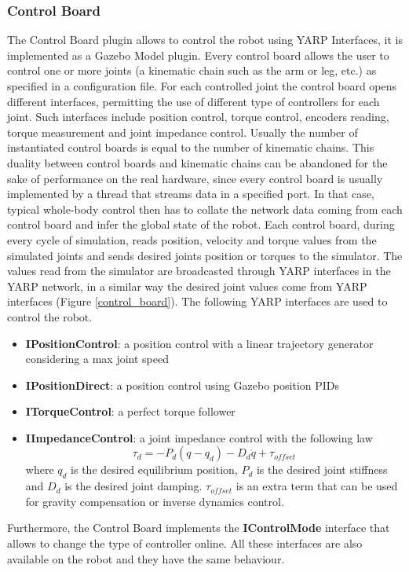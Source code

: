 \subsubsection{Control Board}
The Control Board plugin allows to control the robot using YARP Interfaces, it is implemented as a Gazebo Model plugin. Every control board allows the user to control one or more joints (a kinematic chain such as the arm or leg, etc.) as specified in a configuration file. For each controlled joint the control board opens different interfaces, permitting the use of different type of controllers for each joint. Such interfaces include position control, torque control, encoders reading, torque measurement and joint impedance control. Usually the number of instantiated control boards is equal to the number of kinematic chains.
This duality between control boards and kinematic chains can be abandoned for the sake of performance on the real hardware, since every control board is usually implemented by a thread that streams data in a specified port. In that case, typical whole-body control then has to collate the network data coming from each control board and infer the global state of the robot. Each control board, during every cycle of simulation, reads position, velocity and torque values from the simulated joints and sends desired joints position or torques to the simulator. The values read from the simulator are broadcasted through YARP interfaces in the YARP network, in a similar way the desired joint values come from YARP interfaces (Figure \ref{control_board}). The following YARP interfaces are used to control the robot.
\begin{itemize}
\item \textbf{IPositionControl}: a position control with a linear trajectory generator considering a max joint speed
\item \textbf{IPositionDirect}: a position control using Gazebo position PIDs
\item \textbf{ITorqueControl}: a perfect torque follower
\item \textbf{IImpedanceControl}: a joint impedance control with the following law
\begin{equation}
    \tau_d = -P_d(q-q_d) - D_d\dot{q} + \tau_{offset}
\end{equation}
where $q_d$ is the desired equilibrium position, $P_d$ is the desired joint stiffness and $D_d$ is the desired joint damping. $\tau_{offset}$ is an extra term that can be used for gravity compensation or inverse dynamics control.
\end{itemize}
Furthermore, the Control Board implements the \textbf{IControlMode} interface that allows to change the type of controller online. All these interfaces are also available on the robot and they have the same behaviour.

